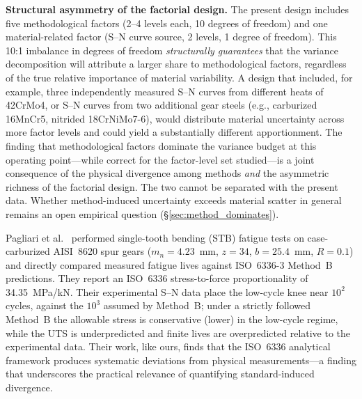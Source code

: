 \documentclass[twocolumn,12pt,a4paper]{article}
\begin{document}
\textbf{Structural asymmetry of the factorial design.} The present
design includes five methodological factors (2--4 levels each,
10 degrees of freedom) and one material-related factor (S--N curve
source, 2 levels, 1 degree of freedom). This 10:1 imbalance in
degrees of freedom \emph{structurally guarantees} that the variance
decomposition will attribute a larger share to methodological factors,
regardless of the true relative importance of material variability.
A design that included, for example, three independently measured
S--N curves from different heats of 42CrMo4, or S--N curves from two
additional gear steels (e.g., carburized 16MnCr5, nitrided
18CrNiMo7-6), would distribute material uncertainty across more factor
levels and could yield a substantially different apportionment. The
finding that methodological factors dominate the variance budget at
this operating point---while correct for the factor-level set
studied---is a joint consequence of the physical divergence among
methods \emph{and} the asymmetric richness of the factorial design.
The two cannot be separated with the present data. Whether
method-induced uncertainty exceeds material scatter in general remains
an open empirical question (\S\ref{sec:method_dominates}).

Pagliari et al.~\cite{pagliari2025} performed single-tooth bending (STB)
fatigue tests on case-carburized AISI~8620 spur gears
($m_n{=}4.23$~mm, $z{=}34$, $b{=}25.4$~mm, $R{=}0.1$) and directly
compared measured fatigue lives against ISO~6336-3 Method~B predictions.
They report an ISO~6336 stress-to-force proportionality of
34.35~MPa/kN. Their experimental S--N data place the low-cycle knee near
$10^2$ cycles, against the $10^3$ assumed by Method~B; under a strictly
followed Method~B the allowable stress is conservative (lower) in the
low-cycle regime, while the UTS is underpredicted and finite lives are
overpredicted relative to the experimental data. Their work, like ours,
finds that the ISO~6336 analytical
framework produces systematic deviations from physical measurements---a
finding that underscores the practical relevance of quantifying
standard-induced divergence.
\end{document}
